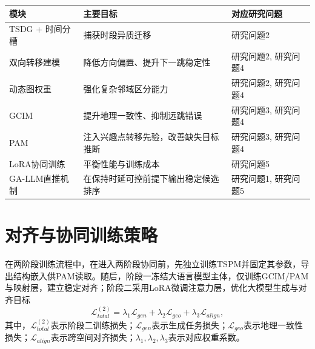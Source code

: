 \begin{table}[H]
    \cThreeTblStyle
    \label{tab:c3-rq-map}
    \begin{tabular}{P{0.22\textwidth}P{0.44\textwidth}P{0.24\textwidth}}
        \toprule
        模块 & 主要目标 & 对应研究问题 \\
        \midrule
        TSDG + 时间分槽 & 捕获时段异质迁移 & 研究问题2 \\
        双向转移建模 & 降低方向偏置、提升下一跳稳定性 & 研究问题2, 研究问题4 \\
        动态图权重 & 强化复杂邻域区分能力 & 研究问题2, 研究问题4 \\
        GCIM & 提升地理一致性、抑制远跳错误 & 研究问题3, 研究问题4 \\
        PAM & 注入兴趣点转移先验，改善缺失目标推断 & 研究问题3, 研究问题4 \\
        LoRA协同训练 & 平衡性能与训练成本 & 研究问题5 \\
        GA-LLM直推机制 & 在保持时延可控前提下输出稳定候选排序 & 研究问题1, 研究问题5 \\
        \bottomrule
    \end{tabular}
\end{table}

\section{对齐与协同训练策略}
在两阶段训练流程中，在进入两阶段协同前，先独立训练TSPM并固定其参数，导出结构嵌入供PAM读取。随后，阶段一冻结大语言模型主体，仅训练GCIM/PAM与映射层，建立稳定对齐；阶段二采用LoRA微调注意力层，优化大模型生成与对齐目标
\begin{equation}
\mathcal{L}_{total}^{(2)}=\lambda_1\mathcal{L}_{gen}+\lambda_2\mathcal{L}_{geo}+\lambda_3\mathcal{L}_{align},
\label{eq:c3-ltotal}
\end{equation}
其中，$\mathcal{L}_{total}^{(2)}$表示阶段二训练损失；$\mathcal{L}_{gen}$表示生成任务损失；$\mathcal{L}_{geo}$表示地理一致性损失；$\mathcal{L}_{align}$表示跨空间对齐损失；$\lambda_1,\lambda_2,\lambda_3$表示对应权重系数。

